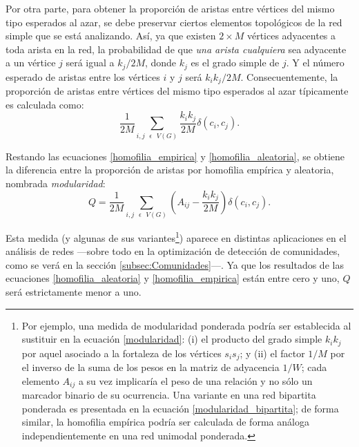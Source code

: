 \documentclass[letterpaper, 11pt]{book}
\theoremstyle{definition}
\theoremstyle{remark}
\begin{document}
Por otra parte, para obtener la proporción de aristas entre vértices del mismo tipo esperados al azar, se debe preservar ciertos elementos topológicos de la red simple que se está analizando. 
Así, ya que existen $2 \times M$ vértices adyacentes a toda arista en la red, la probabilidad de que \emph{una arista cualquiera} sea adyacente a un vértice $j$ será igual a $k_{j}/2M$, donde $k_{j}$ es el grado simple de $j$. 
Y el número esperado de aristas entre los vértices $i$ y $j$ será $k_{i}k_{j}/2M$. 
Consecuentemente, la proporción de aristas entre vértices del mismo tipo esperados al azar típicamente es calculada como:
\begin{equation}\label{homofilia_aleatoria}
    \frac{1}{2M} \sum_{i, j \text{ } \epsilon \text{ } V(G)} \frac{k_{i}k_{j}}{2M} \delta(c_{i},c_{j}).
\end{equation} 

Restando las ecuaciones \ref{homofilia_empirica} y \ref{homofilia_aleatoria}, se obtiene la diferencia entre la proporción de aristas por homofilia empírica y aleatoria, nombrada \emph{modularidad}: 
\begin{equation}\label{modularidad}
    Q = \frac{1}{2M} \sum_{i, j \text{ } \epsilon \text{ } V(G)} \left(A_{ij} - \frac{k_{i}k_{j}}{2M} \right) \delta(c_{i},c_{j}).
\end{equation} 

Esta medida (y algunas de sus variantes\footnote{
    Por ejemplo, una medida de modularidad ponderada podría ser establecida al sustituir en la ecuación \ref{modularidad}: 
    (i) el producto del grado simple $k_{i}k_{j}$ por aquel asociado a la fortaleza de los vértices $s_{i}s_{j}$; 
    y (ii) el factor $1/M$ por el inverso de la suma de los pesos en la matriz de adyacencia $1/W$; cada elemento $A_{ij}$ a su vez implicaría el peso de una relación y no sólo un marcador binario de su ocurrencia. 
    Una variante en una red bipartita ponderada es presentada en la ecuación \ref{modularidad_bipartita}; de forma similar, la homofilia empírica podría ser calculada de forma análoga independientemente en una red unimodal ponderada. 
}) aparece en distintas aplicaciones en el análisis de redes ---sobre todo en la optimización de detección de comunidades, como se verá en la sección \ref{subsec:Comunidades}---. 
Ya que los resultados de las ecuaciones \ref{homofilia_aleatoria} y \ref{homofilia_empirica} están entre cero y uno, $Q$ será estrictamente menor a uno. 
\end{document}
